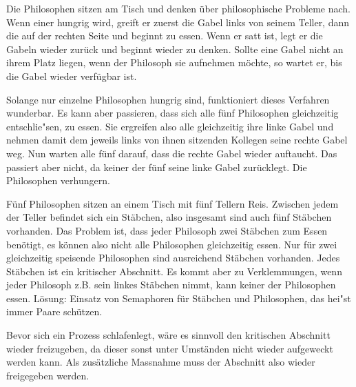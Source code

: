 \begin{answer}
Die Philosophen sitzen am Tisch und denken über philosophische Probleme nach. Wenn einer hungrig wird, greift er zuerst die Gabel links von seinem Teller, dann die auf der rechten Seite und beginnt zu essen. Wenn er satt ist, legt er die Gabeln wieder zurück und beginnt wieder zu denken. Sollte eine Gabel nicht an ihrem Platz liegen, wenn der Philosoph sie aufnehmen möchte, so wartet er, bis die Gabel wieder verfügbar ist.

Solange nur einzelne Philosophen hungrig sind, funktioniert dieses Verfahren wunderbar. Es kann aber passieren, dass sich alle fünf Philosophen gleichzeitig entschlie"sen, zu essen. Sie ergreifen also alle gleichzeitig ihre linke Gabel und nehmen damit dem jeweils links von ihnen sitzenden Kollegen seine rechte Gabel weg. Nun warten alle fünf darauf, dass die rechte Gabel wieder auftaucht. Das passiert aber nicht, da keiner der fünf seine linke Gabel zurücklegt. Die Philosophen verhungern.
\end{answer}

\begin{answer}
Fünf Philosophen sitzen an einem Tisch mit fünf Tellern Reis. Zwischen jedem der Teller befindet
sich ein Stäbchen, also insgesamt sind auch fünf Stäbchen vorhanden. Das Problem ist, dass jeder Philosoph zwei Stäbchen zum Essen benötigt, es können also nicht alle Philosophen gleichzeitig essen. Nur für zwei gleichzeitig speisende Philosophen sind ausreichend Stäbchen vorhanden.
Jedes Stäbchen ist ein kritischer Abschnitt. Es kommt aber zu Verklemmungen, wenn jeder Philosoph z.B. sein linkes Stäbchen nimmt, kann keiner der Philosophen essen.
Lösung: Einsatz von Semaphoren für Stäbchen und Philosophen, das hei"st immer Paare schützen.
\end{answer}

\begin{answer}
Bevor sich ein Prozess schlafenlegt, wäre es sinnvoll den kritischen Abschnitt wieder freizugeben, da dieser sonst unter Umständen nicht wieder aufgeweckt werden kann. Als zusätzliche Massnahme muss der Abschnitt also wieder freigegeben werden.
\end{answer}

